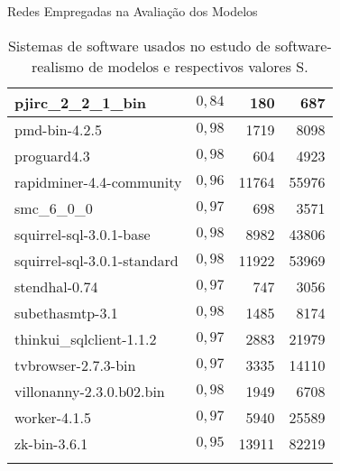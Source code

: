 \begin{chapter}{Redes Empregadas na Avaliação dos Modelos}
\begin{center}
\begin{longtable}{| p{10cm} | c | r | r |}
	pjirc\_2\_2\_1\_bin &  $0,84$ & 180 & 687 \\ \hline
	pmd-bin-4.2.5 &  $0,98$ & 1719 & 8098 \\ \hline
	proguard4.3 &  $0,98$ & 604 & 4923 \\ \hline
	rapidminer-4.4-community &  $0,96$ & 11764 & 55976 \\ \hline
	smc\_6\_0\_0 &  $0,97$ & 698 & 3571 \\ \hline
	squirrel-sql-3.0.1-base &  $0,98$ & 8982 & 43806 \\ \hline
	squirrel-sql-3.0.1-standard &  $0,98$ & 11922 & 53969 \\ \hline
	stendhal-0.74 &  $0,97$ & 747 & 3056 \\ \hline
	subethasmtp-3.1 &  $0,98$ & 1485 & 8174 \\ \hline
	thinkui\_sqlclient-1.1.2 &  $0,97$ & 2883 & 21979 \\ \hline
	tvbrowser-2.7.3-bin &  $0,97$ & 3335 & 14110 \\ \hline
	villonanny-2.3.0.b02.bin &  $0,98$ & 1949 & 6708 \\ \hline
	worker-4.1.5 &  $0,97$ & 5940 & 25589 \\ \hline
	zk-bin-3.6.1 &  $0,95$ & 13911 & 82219 \\ \hline
	
	\caption{\label{tab:redes}Sistemas de software usados no estudo de software-realismo de modelos e respectivos valores S.}
\end{longtable}
\end{center}



\end{chapter}
